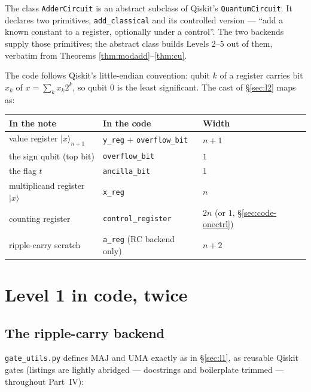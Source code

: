 \documentclass[11pt]{article}
\renewcommand{\ket}[1]{\lvert #1 \rangle}
\newcommand{\MAJ}{\mathrm{MAJ}}
\newcommand{\UMA}{\mathrm{UMA}}
\newcommand{\code}[1]{\texttt{#1}}
\theoremstyle{plain}
\theoremstyle{remark}
\begin{document}
\medskip\noindent
The class \code{AdderCircuit} is an abstract subclass of Qiskit's \code{QuantumCircuit}. It
declares two primitives, \code{add\_classical} and its controlled version --- ``add a known
constant to a register, optionally under a control''. The two backends supply those primitives;
the abstract class builds Levels 2--5 out of them, verbatim from
Theorems \ref{thm:modadd}--\ref{thm:cu}.

\begin{keybox}[title={Dictionary: the note's registers, the code's names}]
The code follows Qiskit's little-endian convention: qubit $k$ of a register carries bit $x_k$ of
$x=\sum_kx_k2^k$, so qubit $0$ is the least significant. The cast of \S\ref{sec:l2} maps as:
\begin{center}
\begin{tabular}{@{}lll@{}}
\toprule
In the note & In the code & Width\\
\midrule
value register $\ket x_{n+1}$ & \code{y\_reg} $+$ \code{overflow\_bit} & $n+1$\\
the sign qubit (top bit) & \code{overflow\_bit} & $1$\\
the flag $t$ & \code{ancilla\_bit} & $1$\\
multiplicand register $\ket x$ & \code{x\_reg} & $n$\\
counting register & \code{control\_register} & $2n$ (or $1$, \S\ref{sec:code-onectrl})\\
ripple-carry scratch & \code{a\_reg} (RC backend only) & $n+2$\\
\bottomrule
\end{tabular}
\end{center}
\end{keybox}

\section{Level 1 in code, twice}\label{sec:code-l1}

\subsection{The ripple-carry backend}

\code{gate\_utils.py} defines $\MAJ$ and $\UMA$ exactly as in \S\ref{sec:l1}, as reusable Qiskit
gates (listings are lightly abridged --- docstrings and boilerplate trimmed --- throughout Part~IV):
\end{document}
